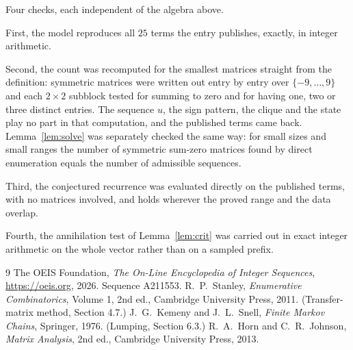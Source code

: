 \documentclass[11pt,a4paper]{article}
\theoremstyle{plain}
\theoremstyle{definition}
\begin{document}
Four checks, each independent of the algebra above.

First, the model reproduces all $25$ terms the entry publishes, exactly, in integer
arithmetic.

Second, the count was recomputed for the smallest matrices straight from the definition:
symmetric matrices were written out entry by entry over $\{-9,\dots,9\}$ and each
$2\times2$ subblock tested for summing to zero and for having one, two or three distinct entries. The
sequence $u$, the sign pattern, the clique and the state play no part in that computation, and
the published terms came back. Lemma~\ref{lem:solve} was separately checked the same way: for
small sizes and small ranges the number of symmetric sum-zero matrices found by direct
enumeration equals the number of admissible sequences.

Third, the conjectured recurrence was evaluated directly on the published terms, with no
matrices involved, and holds wherever the proved range and the data overlap.

Fourth, the annihilation test of Lemma~\ref{lem:crit} was carried out in exact integer
arithmetic on the whole vector rather than on a sampled prefix.

\begin{thebibliography}{9}
 The OEIS Foundation, \emph{The On-Line Encyclopedia of Integer
Sequences}, \url{https://oeis.org}, 2026. Sequence A211553.
 R.~P.~Stanley, \emph{Enumerative Combinatorics}, Volume 1, 2nd ed.,
Cambridge University Press, 2011. (Transfer-matrix method, Section 4.7.)
 J.~G.~Kemeny and J.~L.~Snell, \emph{Finite Markov Chains}, Springer, 1976.
(Lumping, Section 6.3.)
 R.~A.~Horn and C.~R.~Johnson, \emph{Matrix Analysis}, 2nd ed., Cambridge
University Press, 2013.
\end{thebibliography}
\end{document}
